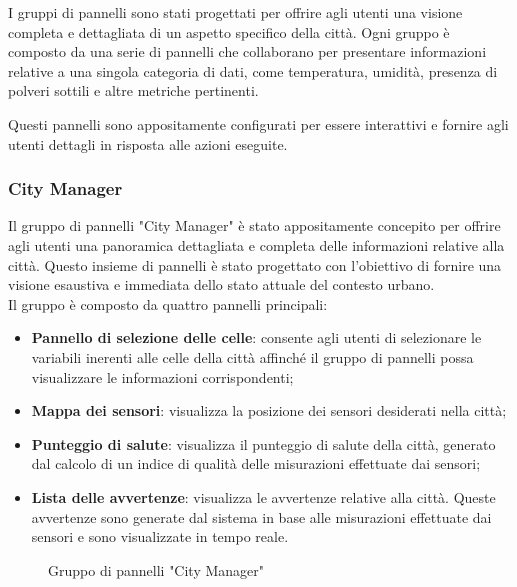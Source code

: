 I gruppi di pannelli sono stati progettati per offrire agli utenti una visione completa e dettagliata di un aspetto specifico della città. Ogni gruppo è composto da una serie di pannelli che collaborano per presentare informazioni relative a una singola categoria di dati, come temperatura, umidità, presenza di polveri sottili e altre metriche pertinenti. 

Questi pannelli sono appositamente configurati per essere interattivi e fornire agli utenti dettagli in risposta alle azioni eseguite.
\\
\subsubsection{City Manager}
Il gruppo di pannelli "City Manager" è stato appositamente concepito per offrire agli utenti una panoramica dettagliata e completa delle informazioni relative alla città. Questo insieme di pannelli è stato progettato con l'obiettivo di fornire una visione esaustiva e immediata dello stato attuale del contesto urbano.\\
Il gruppo è composto da quattro pannelli principali:
\begin{itemize}
    \item \textbf{Pannello di selezione delle celle}: consente agli utenti di selezionare le variabili inerenti alle celle della città affinché il gruppo di pannelli possa visualizzare le informazioni corrispondenti;
    \item \textbf{Mappa dei sensori}: visualizza la posizione dei sensori desiderati nella città;
    \item \textbf{Punteggio di salute}: visualizza il punteggio di salute della città, generato dal calcolo di un indice di qualità delle misurazioni effettuate dai sensori;
    \item \textbf{Lista delle avvertenze}: visualizza le avvertenze relative alla città. Queste avvertenze sono generate dal sistema in base alle misurazioni effettuate dai sensori e sono visualizzate in tempo reale.
\end{itemize}
\begin{figure}[H]
    \centering
    \caption{Gruppo di pannelli "City Manager"}
    \label{fig:my_label}
\end{figure} 


